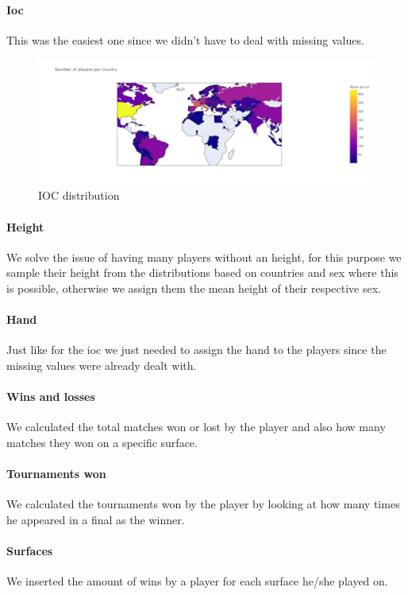 \paragraph{Ioc} This was the easiest one since we didn't have to deal with missing values.
\begin{figure}[H]
    \centering
    \includegraphics[width=0.74\linewidth]{images/data_preparation/ioc_distribution.png}
    \caption{IOC distribution}
    \label{fig:ioc_feature}
\end{figure}

\paragraph{Height} We solve the issue of having many players without an height, for this purpose we sample their height from the distributions based on countries and sex where this is possible, otherwise we assign them the mean height of their respective sex.

\paragraph{Hand} Just like for the ioc we just needed to assign the hand to the players since the missing values were already dealt with.

\paragraph{Wins and losses} We calculated the total matches won or lost by the player and also how many matches they won on a specific surface.

\paragraph{Tournaments won} We calculated the tournaments won by the player by looking at how many times he appeared in a final as the winner.

\paragraph{Surfaces} We inserted the amount of wins by a player for each surface he/she played on.


